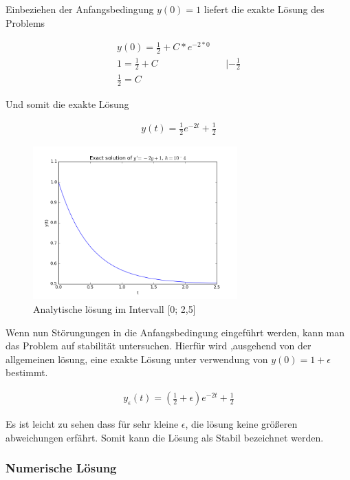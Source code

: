 \documentclass{article}
\begin{document}
			Einbeziehen der Anfangsbedingung $y(0) = 1$ liefert die exakte Lösung des Problems
			
			\begin{align*}
				y(0) = \frac{1}{2} + C*e^{-2*0} \\
				1 = \frac{1}{2} + C && | - \frac{1}{2} \\
				\frac{1}{2} = C
			\end{align*}
			
			Und somit die exakte Lösung
			
			\begin{align}
				y(t) = \frac{1}{2}e^{-2t} + \frac{1}{2}
			\end{align}
			
			\begin{figure}[htbp] 
			  \centering
			     \includegraphics[width=0.7\textwidth]{analytic_solution.png}
			  \caption{Analytische lösung im Intervall [0; 2,5]}
			  \label{fig:Bild1}
			\end{figure}
			
			Wenn nun Störungungen in die Anfangsbedingung eingeführt werden, kann man das Problem auf stabilität untersuchen. Hierfür wird
			,ausgehend von der allgemeinen lösung, eine exakte Lösung unter verwendung von $y(0) = 1 + \epsilon$ bestimmt.
			
			\begin{align*}
				y_{\epsilon}(t) = (\frac{1}{2} + \epsilon)e^{-2t} + \frac{1}{2}
			\end{align*}
			
			Es ist leicht zu sehen dass für sehr kleine $\epsilon$, die lösung keine größeren abweichungen erfährt.
			Somit kann die Lösung als Stabil bezeichnet werden. 
			
		\subsubsection{Numerische Lösung}
		
\end{document}
